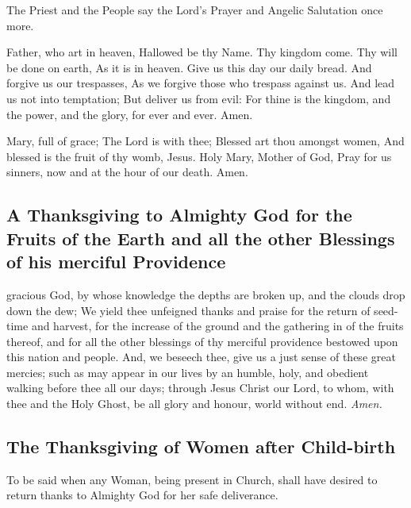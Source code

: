 \begin{rubric}
    The Priest and the People say the Lord's Prayer and Angelic Salutation once more.
\end{rubric}

 Father, who art in heaven, Hallowed be thy Name. Thy kingdom come. Thy will be done on earth, As it is in heaven. Give us this day our daily bread. And forgive us our trespasses, As we forgive those who trespass against us. And lead us not into temptation; But deliver us from evil: For thine is the kingdom, and the power, and the glory, for ever and ever. Amen.

 Mary, full of grace; The Lord is with thee; Blessed art thou amongst women, And blessed is the fruit of thy womb, Jesus. Holy Mary, Mother of God, Pray for us sinners, now and at the hour of our death. Amen.

\clearpage
\fancyhead[RO,LE]{}
\fancyhead[RE,LO]{}
\label{thanksgiving}
{}
\subsection{A Thanksgiving to Almighty God for the Fruits of the Earth and all the other Blessings of his merciful Providence}
 gracious God, by whose knowledge the depths are broken up, and the clouds drop down the dew; We yield thee unfeigned thanks and praise for the return of seed-time and harvest, for the increase of the ground and the gathering in of the fruits thereof, and for all the other blessings of thy merciful providence bestowed upon this nation and people. And, we beseech thee, give us a just sense of these great mercies; such as may appear in our lives by an humble, holy, and obedient walking before thee all our days; through Jesus Christ our Lord, to whom, with thee and the Holy Ghost, be all glory and honour, world without end. \textit{Amen.}

\subsection{The Thanksgiving of Women after Child-birth}
\begin{rubric}
	To be said when any Woman, being present in Church, shall have desired to return thanks to Almighty God for her safe deliverance.
\end{rubric}%

